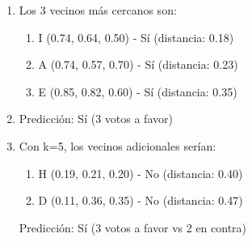 \documentclass[12pt]{article}
\begin{document}
\begin{enumerate}
    \item Los 3 vecinos más cercanos son:
    \begin{enumerate}
        \item I (0.74, 0.64, 0.50) - Sí (distancia: 0.18)
        \item A (0.74, 0.57, 0.70) - Sí (distancia: 0.23)
        \item E (0.85, 0.82, 0.60) - Sí (distancia: 0.35)
    \end{enumerate}
    
    \item Predicción: Sí (3 votos a favor)
    
    \item Con k=5, los vecinos adicionales serían:
    \begin{enumerate}
        \item H (0.19, 0.21, 0.20) - No (distancia: 0.40)
        \item D (0.11, 0.36, 0.35) - No (distancia: 0.47)
    \end{enumerate}
    Predicción: Sí (3 votos a favor vs 2 en contra)
\end{enumerate}
\end{document}
